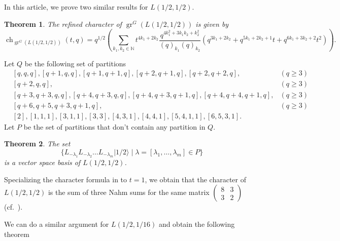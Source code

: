 \documentclass[12pt, reqno]{amsart}
\newtheorem{theorem}{Theorem}[section]
\theoremstyle{remark}
\DeclareMathOperator{\gr}{gr}
\DeclareMathOperator{\ch}{ch}
\newcommand{\vachalf}{|1/2\rangle}
\begin{document}
In this article, we prove two similar results for $L(1/2,1/2)$.

\begin{theorem}
  \label{thr:3}
  The refined character of $\gr^G(L(1/2, 1/2))$ is given by
  \begin{equation*}
    \ch_{\gr^G(L(1/2, 1/2))}(t, q) = q^{1/2}\left(\sum_{k_1, k_2 \in \mathbb{N}}t^{4k_1 + 2k_2}\frac{q^{4k_1^2 + 3k_1k_2 + k_2^2}}{(q)_{k_1}(q)_{k_2}}(q^{3k_1 + 2k_2} + q^{5k_1 + 2k_2 + 1}t + q^{6k_1 + 3k_2 + 2}t^2)\right).
  \end{equation*}
\end{theorem}

Let $Q$ be the following set of partitions
\begin{equation}
  \label{eq:1}
  \begin{aligned}
  &[q, q, q], [q + 1, q, q], [q + 1, q + 1, q], [q + 2, q + 1, q], [q + 2, q + 2, q], &(q \ge 3) \\
  &[q + 2, q, q], &(q \ge 3) \\
  &[q + 3, q + 3, q, q], [q + 4, q + 3, q, q],  [q + 4, q + 3, q + 1, q], [q + 4, q + 4, q + 1, q], &(q \ge 3)\\
  &[q + 6, q + 5, q + 3, q + 1, q], &(q \ge 3) \\
  &[2], [1, 1, 1], [3, 1, 1], [3, 3], [4, 3, 1], [4, 4, 1], [5, 4, 1, 1], [6, 5, 3, 1].
  \end{aligned}
\end{equation}
Let $P$ be the set of partitions that don't contain any partition in $Q$.

\begin{theorem}
  \label{thr:4}
  The set
  \begin{equation*}
    \{L_{-\lambda_1}L_{-\lambda_2}\dots L_{-\lambda_m}\vachalf \mid \lambda = [\lambda_1, \dots, \lambda_m] \in P\}
  \end{equation*}
  is a vector space basis of $L(1/2, 1/2)$.
\end{theorem}

Specializing the character formula in  to $t = 1$, we obtain that the character of $L(1/2, 1/2)$ is the sum of three Nahm sums for the same matrix $\left(\begin{smallmatrix} 8 & 3 \\ 3 & 2 \end{smallmatrix}\right)$ (cf.\ \cite{Nahm2007}).

We can do a similar argument for $L(1/2, 1/16)$ and obtain the following theorem
\end{document}
